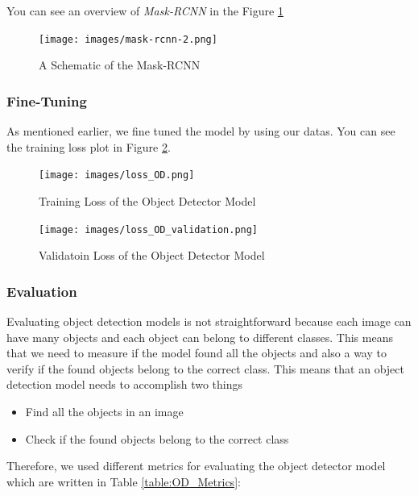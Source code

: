 \documentclass[a4paper, openany]{book}
\begin{document}
You can see an overview of \textit{Mask-RCNN} in the Figure \ref{fig:mask-rcnn-2}

\begin{figure}[ht]
  \centering
    \texttt{[image: images/mask-rcnn-2.png]}
      \caption{A Schematic of the Mask-RCNN}
  \label{fig:mask-rcnn-2}
\end{figure}

\newpage
\subsubsection{Fine-Tuning}
	\vspace{0.3cm}

As mentioned earlier, we fine tuned the model by using our datas. You can see the training loss plot in Figure \ref{fig:loss_OD}.

\begin{figure}[ht]
  \centering
    \texttt{[image: images/loss\_OD.png]}
      \caption{Training Loss of the Object Detector Model}
  \label{fig:loss_OD}
\end{figure}


\begin{figure}[ht]
  \centering
    \texttt{[image: images/loss\_OD\_validation.png]}
      \caption{Validatoin Loss of the Object Detector Model}
  \label{fig:loss_OD_validation}
\end{figure}

\subsubsection{Evaluation}
	\vspace{0.3cm}



Evaluating object detection models is not straightforward because each image can have many objects and each object can belong to different classes. This means that we need to measure if the model found all the objects and also a way to verify if the found objects belong to the correct class. This means that an object detection model needs to accomplish two things

\begin{itemize}
\item Find all the objects in an image
\item Check if the found objects belong to the correct class
\end{itemize}

Therefore, we used different metrics for evaluating the object detector model which are written in Table \ref{table:OD_Metrics}:
\end{document}
